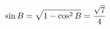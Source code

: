 \documentclass[preview]{standalone}
\begin{document}
\begin{align*}
\special{dvisvgm:raw <g id='unique000'>}\sin B=\sqrt{1-\cos^2 B}=\frac{\sqrt{7}}{4}\special{dvisvgm:raw </g>}
\end{align*}
\end{document}
